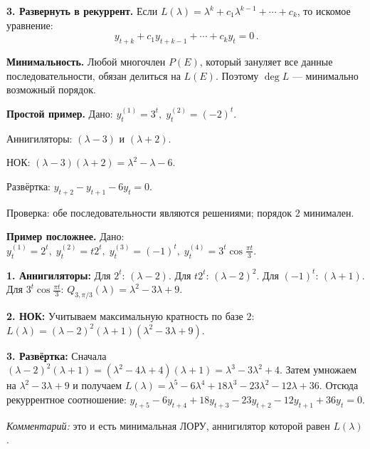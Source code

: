\textbf{3. Развернуть в рекуррент.} Если $L(\lambda)=\lambda^k+c_1\lambda^{k-1}+\cdots+c_k$, то искомое уравнение:
\[
 \boxed{\,y_{t+k}+c_1 y_{t+k-1}+\cdots+c_k y_t=0\,}.
\]

\textbf{Минимальность.} Любой многочлен $P(E)$, который зануляет все данные последовательности, обязан делиться на $L(E)$. Поэтому $\deg L$ — минимально возможный порядок.

\bigskip

\textbf{Простой пример.} Дано: $y_t^{(1)}=3^t,\; y_t^{(2)}=(-2)^t$. \\
\begin{HSESteps}
  \item Аннигиляторы: $(\lambda-3)$ и $(\lambda+2)$.
  \item НОК: $(\lambda-3)(\lambda+2)=\lambda^2-\lambda-6$.
  \item Развёртка: $\boxed{y_{t+2}-y_{t+1}-6y_t=0}$.
\end{HSESteps}
Проверка: обе последовательности являются решениями; порядок $2$ минимален.

\bigskip

\textbf{Пример посложнее.} Дано: $y^{(1)}_t=2^t,\; y^{(2)}_t=t2^t,\; y^{(3)}_t=(-1)^t,\; y^{(4)}_t=3^t\cos\tfrac{\pi t}{3}$.

\textbf{1. Аннигиляторы:} Для $2^t$: $(\lambda-2)$. Для $t2^t$: $(\lambda-2)^2$. Для $(-1)^t$: $(\lambda+1)$. Для $3^t\cos\tfrac{\pi t}{3}$: $Q_{3,\pi/3}(\lambda)=\lambda^2-3\lambda+9$.

\textbf{2. НОК:} Учитываем максимальную кратность по базе $2$: $L(\lambda)=(\lambda-2)^2(\lambda+1)(\lambda^2-3\lambda+9)$.

\textbf{3. Развёртка:} Сначала $(\lambda-2)^2(\lambda+1)=(\lambda^2-4\lambda+4)(\lambda+1)=\lambda^3-3\lambda^2+4$. Затем умножаем на $\lambda^2-3\lambda+9$ и получаем $L(\lambda)=\lambda^5-6\lambda^4+18\lambda^3-23\lambda^2-12\lambda+36$. Отсюда рекуррентное соотношение: $\boxed{y_{t+5}-6y_{t+4}+18y_{t+3}-23y_{t+2}-12y_{t+1}+36y_t=0}$.

\textit{Комментарий:} это и есть минимальная ЛОРУ, аннигилятор которой равен $L(\lambda)$.
